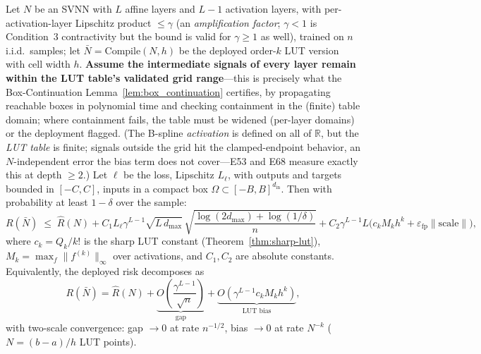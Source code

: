 \setcounter{theorem}{5}
\begin{theorem}
\label{thm:generalization}
Let $N$ be an SVNN with $L$ affine layers and $L-1$ activation layers, with
per-activation-layer Lipschitz product $\leq \gamma$ (an \emph{amplification
factor}; $\gamma < 1$ is Condition~3 contractivity but the bound is valid
for $\gamma \geq 1$ as well), trained on $n$ i.i.d.\ samples; let
$\bar{N} = \mathrm{Compile}(N, h)$ be the deployed order-$k$ LUT version
with cell width $h$. \textbf{Assume the intermediate signals of every
layer remain within the LUT table's validated grid range}---this is
precisely what the Box-Continuation Lemma~\ref{lem:box_continuation}
certifies, by propagating reachable boxes in polynomial time and
checking containment in the (finite) table domain; where containment
fails, the table must be widened (per-layer domains) or the deployment
flagged. (The B-spline \emph{activation} is defined on all of
$\mathbb{R}$, but the \emph{LUT table} is finite; signals outside the
grid hit the clamped-endpoint behavior, an $N$-independent error the
bias term does not cover---E53 and E68 measure exactly this at depth
$\geq 2$.) Let $\ell$ be the loss, Lipschitz $L_\ell$, with outputs and
targets bounded in $[-C, C]$, inputs in a compact box $\Omega \subset
[-B, B]^{d_{\text{in}}}$. Then with probability at least $1-\delta$ over
the sample:
\begin{equation}
R(\bar{N}) \;\leq\; \hat{R}(N) +
C_1 L_\ell \gamma^{L-1} \sqrt{L\, d_{\max}}\,
\sqrt{\frac{\log(2d_{\max}) + \log(1/\delta)}{n}}
+ C_2 \gamma^{L-1} L \bigl( c_k M_k h^k + \varepsilon_{\mathrm{fp}} \|\mathrm{scale}\| \bigr),
\label{eq:compile_aware}
\end{equation}
where $c_k = Q_k/k!$ is the sharp LUT constant
(Theorem~\ref{thm:sharp-lut}), $M_k = \max_f \|f^{(k)}\|_\infty$ over
activations, and $C_1, C_2$ are absolute constants. Equivalently, the
deployed risk decomposes as
\begin{equation}
R(\bar{N}) = \hat{R}(N) + \underbrace{O\!\left(\frac{\gamma^{L-1}}{\sqrt{n}}\right)}_{\text{gap}}
+ \underbrace{O\!\left(\gamma^{L-1} c_k M_k h^k\right)}_{\text{LUT bias}},
\label{eq:two_scale}
\end{equation}
with two-scale convergence: gap $\to 0$ at rate $n^{-1/2}$, bias $\to 0$
at rate $N^{-k}$ ($N = (b-a)/h$ LUT points).
\end{theorem}

